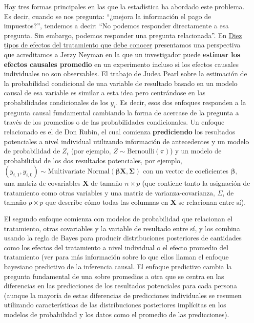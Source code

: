 \documentclass[
]{article}
\begin{document}
Hay tres formas principales en las que la estadística ha abordado este problema. Es decir, cuando se nos pregunta: ``¿mejora la información el pago de impuestos?'', tendemos a decir: ``No podemos responder directamente a esa pregunta. Sin embargo, podemos responder una pregunta relacionada''. En \href{https://egap.org/resource/10-types-treatment-effect-you-should-know-about}{Diez tipos de efectos del tratamiento que debe conocer} presentamos una perspectiva que acreditamos a Jerzy Neyman en la que un investigador puede \textbf{estimar los efectos causales promedio} en un experimento incluso si los efectos causales individuales no son observables. El trabajo de Judea Pearl sobre la estimación de la probabilidad condicional de una variable de resultado basado en un modelo causal de esa variable es similar a esta idea pero centrándose en las probabilidades condicionales de los \(y_ {i}\). Es decir, esos dos enfoques responden a la pregunta causal fundamental cambiando la forma de acercase de la pregunta a través de los promedios o de las probabilidades condicionales. Un enfoque relacionado es el de Don Rubin, el cual comienza \textbf{prediciendo} los resultados potenciales a nivel individual utilizando información de antecedentes y un modelo de probabilidad de \(Z_i\) (por ejemplo, \(Z \sim \text{Bernoulli} (\pi)\)) y un modelo de probabilidad de los dos resultados potenciales, por ejemplo,
\((y_{i,1},y_{i,0}) \sim \text{Multivariate Normal}(\boldsymbol{\beta}\mathbf{X}, \boldsymbol{\Sigma})\) con un vector de coeficientes \(\boldsymbol{\beta}\), una matriz de covariables \(\mathbf{X}\) de tamaño \(n \times p\) (que contiene tanto la asignación de tratamiento como otras variables y una matriz de varianza-covarianza, \(\Sigma\), de tamaño \(p \times p\) que describe cómo todas las columnas en \(\mathbf{X}\) se relacionan entre sí).

El segundo enfoque comienza con modelos de probabilidad que relacionan el tratamiento, otras covariables y la variable de resultado entre sí, y
los combina usando la regla de Bayes para producir distribuciones posteriores de cantidades como los efectos del tratamiento a nivel individual o el efecto promedio del tratamiento (ver \autocite{imbens2007causal} para más información sobre lo que ellos llaman el enfoque bayesiano predictivo de la inferencia causal. El enfoque predictivo cambia la pregunta fundamental de una sobre promedios a otra que se centra en las diferencias en las predicciones de los resultados potenciales para cada persona (aunque la mayoría de estas diferencias de predicciones individuales se resumen utilizando características de las distribuciones posteriores implícitas en los modelos de probabilidad y los datos como el promedio de las predicciones).
\end{document}
